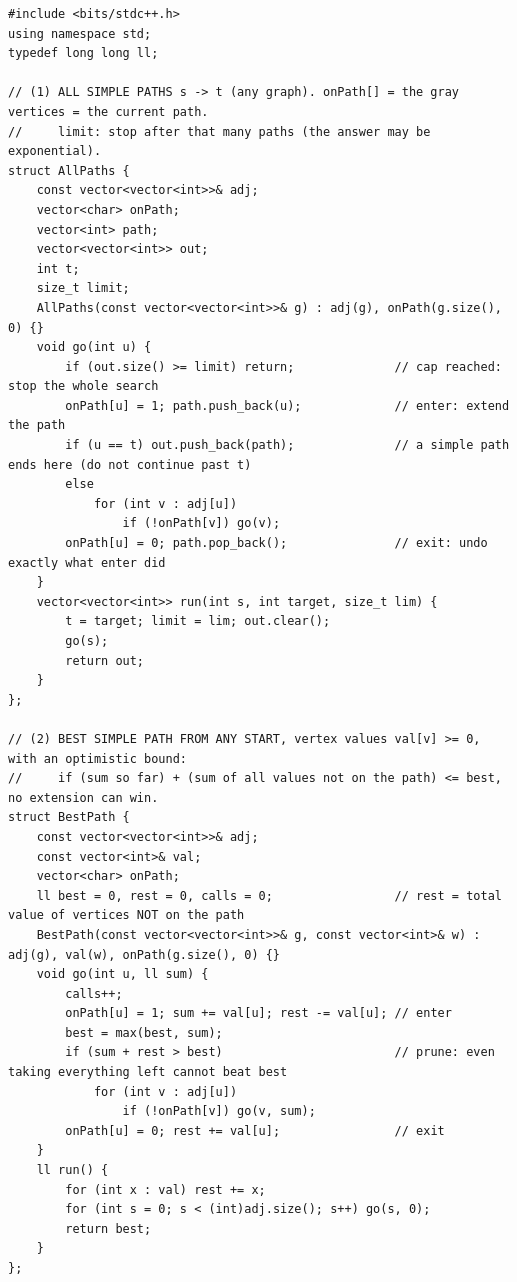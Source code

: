 \begin{lstlisting}[style=cpp]
#include <bits/stdc++.h>
using namespace std;
typedef long long ll;

// (1) ALL SIMPLE PATHS s -> t (any graph). onPath[] = the gray vertices = the current path.
//     limit: stop after that many paths (the answer may be exponential).
struct AllPaths {
    const vector<vector<int>>& adj;
    vector<char> onPath;
    vector<int> path;
    vector<vector<int>> out;
    int t;
    size_t limit;
    AllPaths(const vector<vector<int>>& g) : adj(g), onPath(g.size(), 0) {}
    void go(int u) {
        if (out.size() >= limit) return;              // cap reached: stop the whole search
        onPath[u] = 1; path.push_back(u);             // enter: extend the path
        if (u == t) out.push_back(path);              // a simple path ends here (do not continue past t)
        else
            for (int v : adj[u])
                if (!onPath[v]) go(v);
        onPath[u] = 0; path.pop_back();               // exit: undo exactly what enter did
    }
    vector<vector<int>> run(int s, int target, size_t lim) {
        t = target; limit = lim; out.clear();
        go(s);
        return out;
    }
};

// (2) BEST SIMPLE PATH FROM ANY START, vertex values val[v] >= 0, with an optimistic bound:
//     if (sum so far) + (sum of all values not on the path) <= best, no extension can win.
struct BestPath {
    const vector<vector<int>>& adj;
    const vector<int>& val;
    vector<char> onPath;
    ll best = 0, rest = 0, calls = 0;                 // rest = total value of vertices NOT on the path
    BestPath(const vector<vector<int>>& g, const vector<int>& w) : adj(g), val(w), onPath(g.size(), 0) {}
    void go(int u, ll sum) {
        calls++;
        onPath[u] = 1; sum += val[u]; rest -= val[u]; // enter
        best = max(best, sum);
        if (sum + rest > best)                        // prune: even taking everything left cannot beat best
            for (int v : adj[u])
                if (!onPath[v]) go(v, sum);
        onPath[u] = 0; rest += val[u];                // exit
    }
    ll run() {
        for (int x : val) rest += x;
        for (int s = 0; s < (int)adj.size(); s++) go(s, 0);
        return best;
    }
};


\end{lstlisting}
